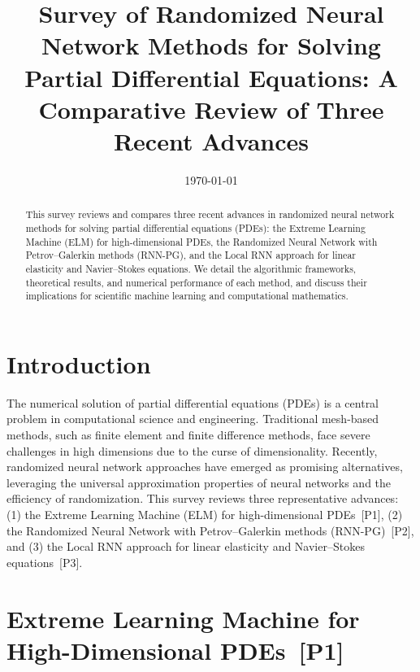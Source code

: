 \documentclass[11pt]{article}
\title{Survey of Randomized Neural Network Methods for Solving Partial Differential Equations: A Comparative Review of Three Recent Advances}
\author{ }
\date{\today}
\begin{document}
\maketitle

\begin{abstract}
This survey reviews and compares three recent advances in randomized neural network methods for solving partial differential equations (PDEs): the Extreme Learning Machine (ELM) for high-dimensional PDEs, the Randomized Neural Network with Petrov–Galerkin methods (RNN-PG), and the Local RNN approach for linear elasticity and Navier–Stokes equations. We detail the algorithmic frameworks, theoretical results, and numerical performance of each method, and discuss their implications for scientific machine learning and computational mathematics.
\end{abstract}

\section{Introduction}
The numerical solution of partial differential equations (PDEs) is a central problem in computational science and engineering. Traditional mesh-based methods, such as finite element and finite difference methods, face severe challenges in high dimensions due to the curse of dimensionality. Recently, randomized neural network approaches have emerged as promising alternatives, leveraging the universal approximation properties of neural networks and the efficiency of randomization. This survey reviews three representative advances: (1) the Extreme Learning Machine (ELM) for high-dimensional PDEs~[P1], (2) the Randomized Neural Network with Petrov–Galerkin methods (RNN-PG)~[P2], and (3) the Local RNN approach for linear elasticity and Navier–Stokes equations~[P3].

\section{Extreme Learning Machine for High-Dimensional PDEs~[P1]}
\end{document}
